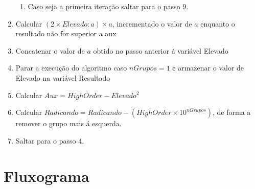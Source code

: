 \begin{enumerate}
\begin{enumerate}
		\item Caso seja a primeira iteração saltar para o passo 9.
	\end{enumerate}
	\item Calcular $(2\times Elevado:a)\times a$, incrementado o valor de $a$ enquanto o resultado não for superior a aux
	\item Concatenar o valor de $a$ obtido no passo anterior á variável Elevado
	\item Parar a execução do algoritmo caso $nGrupos = 1$ e armazenar o valor de Elevado na variável Resultado
	\item Calcular $Aux = HighOrder - Elevado^{2}$ 
	\item Calcular $Radicando = Radicando - (HighOrder\times 10^{nGrupos})$, de forma a remover o grupo mais á esquerda.
	\item Saltar para o passo 4.
\end{enumerate}

\section{Fluxograma}